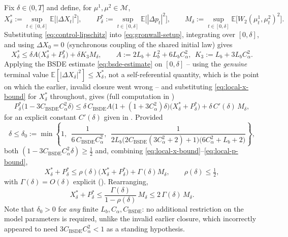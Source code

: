 \documentclass[11pt]{article}
\theoremstyle{remark}
\begin{document}
Fix $\delta \in (0,T]$ and define, for $\mu^1,\mu^2 \in \mathcal{M}$,
\[
    X^*_\delta := \sup_{t\in[0,\delta]} \mathbb{E}\big[|\Delta X_t|^2\big], \qquad
    P^*_\delta := \sup_{t\in[0,\delta]} \mathbb{E}\big[|\Delta p_t|^2\big], \qquad
    M_\delta := \sup_{t\in[0,\delta]} \mathbb{E}\big[W_2(\mu_t^1,\mu_t^2)^2\big].
\]
Substituting \eqref{eq:control-lipschitz} into \eqref{eq:gronwall-setup}, integrating
over $[0,\delta]$, and using $\Delta X_0 = 0$ (synchronous coupling of the shared
initial law) gives
\begin{equation}
    X^*_\delta \le \delta A \big(X^*_\delta+P^*_\delta\big) + \delta K_3 M_\delta,
    \qquad A := 2L_b+L_b^2+6L_bC_\alpha^2,\ \ K_3 := L_b+3L_bC_\alpha^2.
    \label{eq:local-x-bound}
\end{equation}
Applying the BSDE estimate \eqref{eq:bsde-estimate} on $[0,\delta]$ -- using the
\emph{genuine} terminal value $\mathbb{E}[|\Delta X_\delta|^2] \le X^*_\delta$, not a
self-referential quantity, which is the point on which the earlier, invalid closure
went wrong -- and substituting \eqref{eq:local-x-bound} for $X^*_\delta$ throughout,
gives (full computation in )
\begin{equation}
    P^*_\delta\big(1 - 3C_{\mathrm{BSDE}}C_\alpha^2\delta\big) \le
    \delta\, C_{\mathrm{BSDE}} A\big(1+(1+3C_\alpha^2)\delta\big)
    \big(X^*_\delta+P^*_\delta\big) + \delta\, C'(\delta)\, M_\delta,
    \label{eq:local-p-bound}
\end{equation}
for an explicit constant $C'(\delta)$ given in . Provided
\begin{equation}
    \delta \le \delta_0 := \min\left\{ 1,\ \ \frac{1}{6\,C_{\mathrm{BSDE}}C_\alpha^2},\ \
    \frac{1}{2L_b\big(2C_{\mathrm{BSDE}}(3C_\alpha^2+2)+1\big)\big(6C_\alpha^2+L_b+2\big)}
    \right\},
    \label{eq:delta0}
\end{equation}
both $(1-3C_{\mathrm{BSDE}}C_\alpha^2\delta) \ge \tfrac12$ and, combining
\eqref{eq:local-x-bound}--\eqref{eq:local-p-bound},
\begin{equation}
    X^*_\delta + P^*_\delta \le \rho(\delta)\big(X^*_\delta+P^*_\delta\big) +
    \Gamma(\delta) M_\delta, \qquad \rho(\delta) \le \tfrac12,
    \label{eq:local-closed}
\end{equation}
with $\Gamma(\delta) = O(\delta)$ explicit (). Rearranging,
\begin{equation}
    X^*_\delta + P^*_\delta \le \frac{\Gamma(\delta)}{1-\rho(\delta)}\, M_\delta \le
    2\,\Gamma(\delta)\, M_\delta.
    \label{eq:local-final}
\end{equation}
Note that $\delta_0 > 0$ for \emph{any} finite $L_b, C_\alpha, C_{\mathrm{BSDE}}$: no
additional restriction on the model parameters is required, unlike the invalid
earlier closure, which incorrectly appeared to need $3C_{\mathrm{BSDE}}C_\alpha^2 <
1$ as a standing hypothesis.
\end{document}
